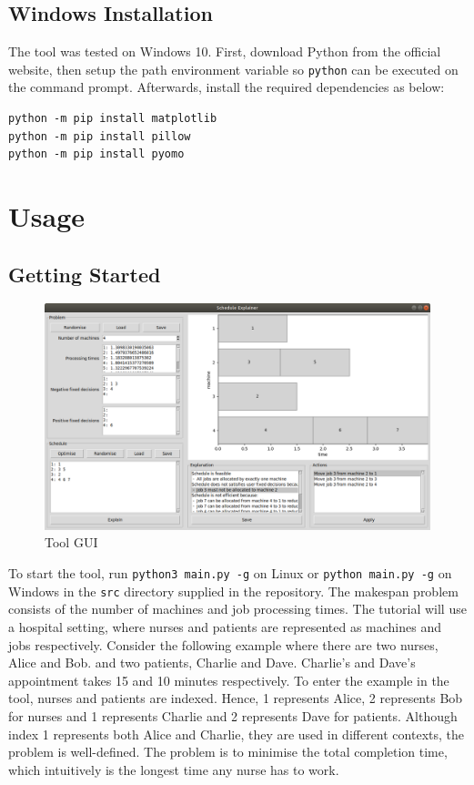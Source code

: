 \subsection{Windows Installation}

The tool was tested on Windows 10. First, download Python from the official website, then setup the path environment variable so \texttt{python} can be executed on the command prompt. Afterwards, install the required dependencies as below: 

\begin{verbatim}
python -m pip install matplotlib
python -m pip install pillow
python -m pip install pyomo
\end{verbatim}

\section{Usage}

\subsection{Getting Started}

\begin{figure}[H]
	\centering
	\includegraphics[width=\linewidth]{figures/tool_gui.png}
	\caption{Tool GUI}
\end{figure}

To start the tool, run \texttt{python3 main.py -g} on Linux or \texttt{python main.py -g} on Windows in the \texttt{src} directory supplied in the repository.
\linespace
The makespan problem consists of the number of machines and job processing times. The tutorial will use a hospital setting, where nurses and patients are represented as machines and jobs respectively. Consider the following example where there are two nurses, Alice and Bob. and two patients, Charlie and Dave. Charlie's and Dave's appointment takes 15 and 10 minutes respectively. To enter the example in the tool, nurses and patients are indexed. Hence, 1 represents Alice, 2 represents Bob for nurses and 1 represents Charlie and 2 represents Dave for patients. Although index 1 represents both Alice and Charlie, they are used in different contexts, the problem is well-defined. The problem is to minimise the total completion time, which intuitively is the longest time any nurse has to work.

